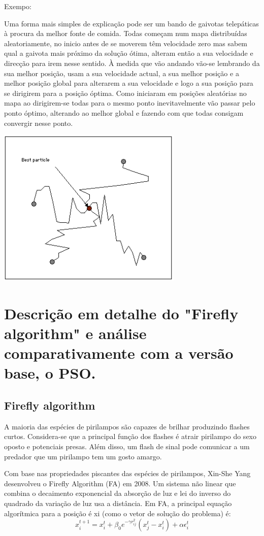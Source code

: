 \documentclass[10pt]{article}
\begin{document}
Exempo:

Uma forma mais simples de explicação pode ser um bando de gaivotas telepáticas à procura da melhor fonte de comida. Todas começam num mapa distribuídas aleatoriamente, no inicio antes de se moverem têm velocidade
zero mas sabem qual a gaivota mais próximo da solução ótima, alteram então a sua velocidade e direcção para
irem nesse sentido. À medida que vão andando vão-se lembrando da sua melhor posição, usam a sua velocidade actual, a sua melhor posição e a melhor posição global para alterarem a sua velocidade e logo a sua
posição para se dirigirem para a posição óptima. Como iniciaram em posições aleatórias no mapa ao dirigirem-se todas para o mesmo ponto inevitavelmente vão passar pelo ponto óptimo, alterando ao
melhor global e fazendo com que todas consigam convergir nesse ponto.

\includegraphics{img/PSO.png}

\newpage
\section{Descrição em detalhe do "Firefly algorithm" e análise comparativamente com a versão base, o PSO.}\label{sec:desc-algo}
\subsection{Firefly algorithm}

A maioria das espécies de pirilampos são capazes de brilhar produzindo flashes curtos. Considera-se que a principal função 
dos flashes é atrair pirilampo do sexo oposto e potenciais presas. Além disso, um flash de sinal pode comunicar a um 
predador que um pirilampo tem um gosto amargo.

Com base nas propriedades piscantes das espécies de 
pirilampos, Xin-She Yang desenvolveu o 
Firefly Algorithm (FA) em 2008. Um sistema não linear que 
combina o decaimento exponencial da absorção de luz e lei do 
inverso do quadrado da variação de luz usa a distância. 
Em FA, a principal equação algorítmica para a posição é xi 
(como o vetor de solução do problema) é:
\begin{equation}
  x_i^{t+1} = x_i^t + \beta_0e^{-\gamma r^2_{ij}}(x_j^t - x_i^t) + \alpha \epsilon_i^t
\end{equation}
\end{document}
